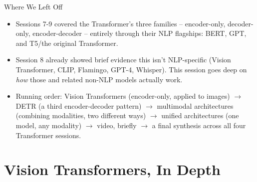 \begin{vbframe}{Where We Left Off}
\begin{itemize}
  \item Sessions 7-9 covered the Transformer's three families -- encoder-only, decoder-only, encoder-decoder -- entirely through their NLP flagships: BERT, GPT, and T5/the original Transformer.
  \item Session 8 already showed brief evidence this isn't NLP-specific (Vision Transformer, CLIP, Flamingo, GPT-4, Whisper). This session goes deep on \emph{how} those and related non-NLP models actually work.
  \item Running order: Vision Transformers (encoder-only, applied to images) $\to$ DETR (a third encoder-decoder pattern) $\to$ multimodal architectures (combining modalities, two different ways) $\to$ unified architectures (one model, any modality) $\to$ video, briefly $\to$ a final synthesis across all four Transformer sessions.
\end{itemize}
\end{vbframe}


\section{Vision Transformers, In Depth}

